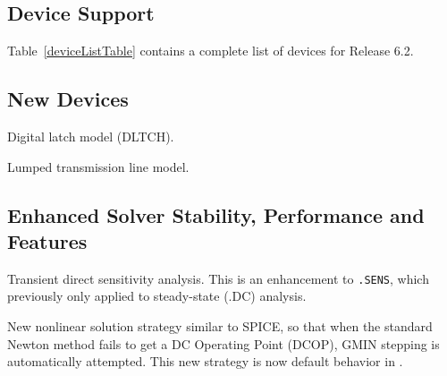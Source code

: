 \documentclass[11pt,report,strict]{SANDreport}
\begin{document}
\subsection{Device Support}
Table~\ref{deviceListTable} contains a complete list of devices for \Xyce{}
Release 6.2.




\subsection{New Devices}
\begin{XyceItemize}
\item Digital latch model (DLTCH).
\item Lumped transmission line model.
\end{XyceItemize}

\subsection{Enhanced Solver Stability, Performance and Features}
\begin{XyceItemize}
\item Transient direct sensitivity analysis.  This is an enhancement to {\texttt{.SENS}},
which previously only applied to steady-state (.DC) analysis.
\item New nonlinear solution strategy similar to SPICE, so that when the standard Newton method fails to get a DC Operating Point (DCOP), GMIN stepping is automatically attempted.  This new strategy is now default behavior in \Xyce{}.
\end{XyceItemize}

\end{document}
